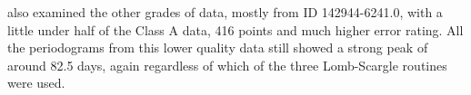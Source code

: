 {\FirstP} also examined the other grades of {\asas} data, mostly from ID 142944-6241.0, with a little under half of the
Class A data, 416 points and much higher error rating. All the periodograms from this lower quality data still showed a
strong peak of around 82.5 days, again regardless of which of the three Lomb-Scargle routines were used.



